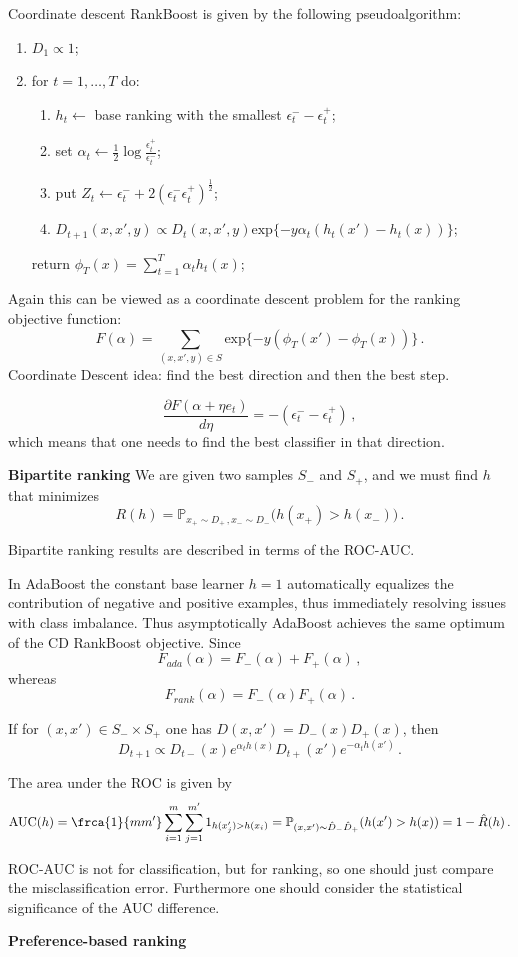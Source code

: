 \documentclass[a4paper]{article}
\newcommand{\pr}{\mathbb{P}}
\begin{document}
Coordinate descent RankBoost is given by the following pseudoalgorithm:
\begin{enumerate}
    \item $D_1\propto 1$;
    \item for $t=1,\ldots, T$ do: \begin{enumerate}
        \item $h_t\leftarrow $ base ranking with the smallest $\epsilon^-_t-\epsilon^+_t$;
        \item set $\alpha_t \leftarrow \frac{1}{2}\log\frac{\epsilon^+_t}{\epsilon^-_t}$;
        \item put $Z_t \leftarrow \epsilon^-_t + 2(\epsilon^-_t\epsilon^+_t)^\frac{1}{2}$;
        \item $D_{t+1}(x,x',y) \propto D_t(x,x',y) \text{exp} \{ -y\alpha_t(h_t(x')-h_t(x)) \}$;
    \end{enumerate}
    return $\phi_T(x) = \sum_{t=1}^T \alpha_t h_t(x)$;
\end{enumerate}

Again this can be viewed as a coordinate descent problem for the ranking objective
function:
\[ F(\alpha) = \sum_{(x,x',y)\in S} \text{exp}\{-y(\phi_T(x')-\phi_T(x))\} \,. \]
Coordinate Descent idea: find the best direction and then the best step.

\[\frac{\partial F(\alpha + \eta e_t)}{d \eta}
    = -(\epsilon^-_t - \epsilon^+_t) \,,\]
which means that one needs to find the best classifier in that direction.

\textbf{Bipartite ranking} We are given two samples $S_-$ and $S_+$, and
we must find $h$ that minimizes
\[R(h) = \pr_{x_+\sim D_+\,,x_-\sim D_-} \bigl( h(x_+) > h(x_-) \bigr) \,. \]

Bipartite ranking results are described in terms of the ROC-AUC.

In AdaBoost the constant base learner $h=1$ automatically equalizes the contribution
of negative and positive examples, thus immediately resolving issues with class
imbalance. Thus asymptotically AdaBoost achieves the same optimum of the CD RankBoost
objective.
Since
\[F_{ada}(\alpha) = F_-(\alpha) + F_+(\alpha)\,,\]
whereas
\[F_{rank}(\alpha) = F_-(\alpha) F_+(\alpha)\,.\]

If for $(x,x')\in S_-\times S_+$ one has $D(x,x') = D_-(x) D_+(x)$, then
\[ D_{t+1} \propto D_{t-}(x) e^{\alpha_t h(x)} D_{t+}(x') e^{-\alpha_t h(x')}
    \,. \]

The area under the ROC is given by
\[ \text{AUC}(h)
    = \frca{1}{mm'}\sum_{i=1}^m \sum_{j=1}^{m'} 1_{h(x_j') > h(x_i)}
    = \pr_{(x,x')\sim \hat{D}_-\hat{D}_+}(h(x') > h(x))
    = 1 - \hat{R}(h)
    \,. \]

ROC-AUC is not for classification, but for ranking, so one should just compare the
misclassification error. Furthermore one should consider the statistical significance
of the AUC difference.

\textbf{Preference-based ranking} 



%
\end{document}
